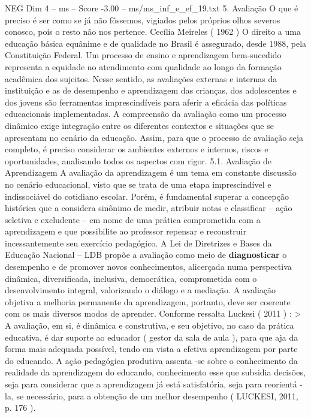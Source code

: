 \begin{textsample}{NEG Dim 4 – ms – Score -3.00 – ms/ms\_inf\_e\_ef\_19.txt}  \label{ex:f4_neg_131}
5.
Avaliação O que é preciso é ser como se já não fôssemos, vigiados pelos próprios olhos severos conosco, pois o resto não nos pertence.
Cecília Meireles ( 1962 ) O direito a uma educação básica equânime e de qualidade no Brasil é assegurado, desde 1988, pela Constituição Federal.
Um processo de ensino e aprendizagem bem-sucedido representa a equidade no atendimento com qualidade ao longo da formação acadêmica dos sujeitos.
Nesse sentido, as avaliações externas e internas da instituição e as de desempenho e aprendizagem das crianças, dos adolescentes e dos jovens são ferramentas imprescindíveis para aferir a eficácia das políticas educacionais implementadas.
A compreensão da avaliação como um processo dinâmico exige integração entre os diferentes contextos e situações que se apresentam no cenário da educação.
Assim, para que o processo de avaliação seja completo, é preciso considerar os ambientes externos e internos, riscos e oportunidades, analisando todos os aspectos com rigor. 5.1.
Avaliação de Aprendizagem A avaliação da aprendizagem é um tema em constante discussão no cenário educacional, visto que se trata de uma etapa imprescindível e indissociável do cotidiano escolar.
Porém, é fundamental superar a concepção histórica que a considera sinônimo de medir, atribuir notas e classificar – ação seletiva e excludente – em nome de uma prática comprometida com a aprendizagem e que possibilite ao professor repensar e reconstruir incessantemente seu exercício pedagógico.
A Lei de Diretrizes e Bases da Educação Nacional – LDB propõe a avaliação como meio de \textbf{diagnosticar} o desempenho e de promover novos conhecimentos, alicerçada numa perspectiva dinâmica, diversificada, inclusiva, democrática, comprometida com o desenvolvimento integral, valorizando o diálogo e a mediação.
A avaliação objetiva a melhoria permanente da aprendizagem, portanto, deve ser coerente com os mais diversos modos de aprender.
Conforme ressalta Luckesi ( 2011 ) : > A avaliação, em si, é dinâmica e construtiva, e seu objetivo, no caso da prática educativa, é dar suporte ao educador ( gestor da sala de aula ), para que aja da forma mais adequada possível, tendo em vista a efetiva aprendizagem por parte do educando.
A ação pedagógica produtiva assenta -se sobre o conhecimento da realidade da aprendizagem do educando, conhecimento esse que subsidia decisões, seja para considerar que a aprendizagem já está satisfatória, seja para reorientá -la, se necessário, para a obtenção de um melhor desempenho ( LUCKESI, 2011, p. 176 ).

\end{textsample}
